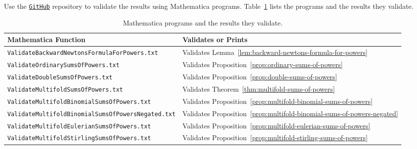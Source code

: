 Use the
\href{https://github.com/kolosovpetro/SumsOfPowersViaBackwardFiniteDifferencesAndNewtonFormula/tree/main/mathematica}
{\texttt{GitHub}}
repository to validate the results using Mathematica programs. Table~\ref{tab:mathematica-validation}
lists the programs and the results they validate.
\begin{table}[ht]
\centering
  \renewcommand{\arraystretch}{1.3}
  \begin{tabular}{ll}
    \toprule
    Mathematica Function  & Validates or Prints \\
    \midrule
    \texttt{ValidateBackwardNewtonsFormulaForPowers.txt}
    & Validates Lemma~\eqref{lem:backward-newtons-formula-for-powers}
    \\
    \texttt{ValidateOrdinarySumsOfPowers.txt}
    & Validates Proposition~\eqref{prop:ordinary-sums-of-powers}
    \\
    \texttt{ValidateDoubleSumsOfPowers.txt}
    & Validates Proposition~\eqref{prop:double-sums-of-powers}
    \\
    \texttt{ValidateMultifoldSumsOfPowers.txt}
    & Validates Theorem~\eqref{thm:multifold-sums-of-powers}
    \\
    \texttt{ValidateMultifoldBinomialSumsOfPowers.txt}
    & Validates Proposition~\eqref{prop:multifold-binomial-sums-of-powers}
    \\
    \texttt{ValidateMultifoldBinomialSumsOfPowersNegated.txt}
    & Validates Proposition~\eqref{prop:multifold-binomial-sums-of-powers-negated}
    \\
    \texttt{ValidateMultifoldEulerianSumsOfPowers.txt}
    & Validates Proposition~\eqref{prop:multifold-eulerian-sums-of-powers}
    \\
    \texttt{ValidateMultifoldStirlingSumsOfPowers.txt}
    & Validates Proposition~\eqref{prop:multifold-stirling-sums-of-powers}
    \\
    \bottomrule
  \end{tabular}
  \caption{Mathematica programs and the results they validate.}
  \label{tab:mathematica-validation}
\end{table}

